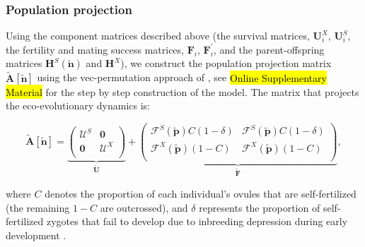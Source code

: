 \documentclass[11pt,draft]{article}
\def\mbf#1{\mathbf{#1}}
\def\mcal#1{\mathcal{#1}}
\begin{document}
\subsubsection*{Population projection}
Using the component matrices described above (the survival matrices, $\mathbf{U}^X_i$, $\mathbf{U}^S_i$, the fertility and mating success matrices, $\mathbf{F}_i$, $\mathbf{F}^\prime_i$, and the parent-offspring matrices $\mbf{H}^S(\tilde{\mbf{n}})$ and $\mbf{H}^X$), we construct the population projection matrix $\tilde{\mbf{A}}[\tilde{\mbf{n}}]$ using the vec-permutation approach of \citet{CaswellEtAl2018}, see \hl{Online Supplementary Material} for the step by step construction of the model. The matrix that projects the eco-evolutionary dynamics is:
\begin{linenomath*}
\begin{equation} \label{eq:Atilde}
	\tilde{\mbf{A}}[\tilde{\mbf{n}}] = 
			\underbrace{\left(
			\begin{array}{c|c}
				\mcal{U}^S & \mbf{0} \\ \hline
				\mbf{0} & \mcal{U}^X \\
			\end{array} \right)}_{\tilde{\mbf{U}}} + 
			\underbrace{\left(
			\begin{array}{c|c}
				\mcal{F}^S(\tilde{\mbf{p}}) C(1 - \delta) & \mcal{F}^S(\tilde{\mbf{p}}) C(1 - \delta) \\ \hline
				\mcal{F}^X(\tilde{\mbf{p}}) (1 - C) & \mcal{F}^X(\tilde{\mbf{p}}) (1 - C)\\
			\end{array} \right)}_{\tilde{\mbf{F}}},
\end{equation}
\end{linenomath*}
where $C$ denotes the proportion of each individual's ovules that are self-fertilized (the remaining $1 - C$ are outcrossed), and  $\delta$ represents the proportion of self-fertilized zygotes that fail to develop due to inbreeding depression during early development \citep{Charlesworth1987}. 
\end{document}
